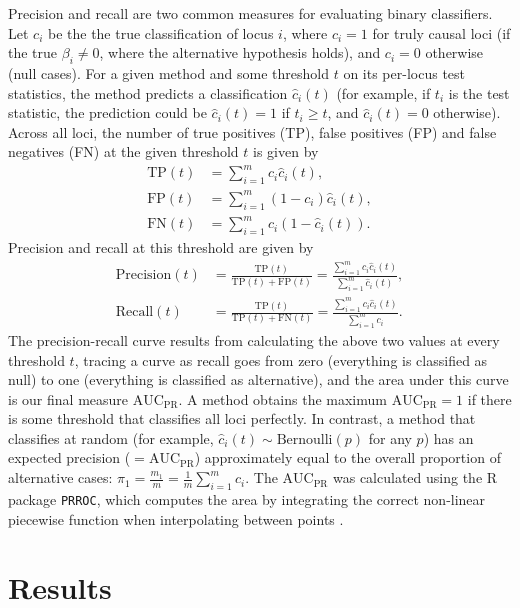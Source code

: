 \documentclass[11pt]{article}
\newcommand{\auc}{\text{AUC}_\text{PR}}
\begin{document}
Precision and recall are two common measures for evaluating binary classifiers.
Let $c_i$ be the the true classification of locus $i$, where $c_i = 1$ for truly causal loci (if the true $\beta_i \ne 0$, where the alternative hypothesis holds), and $c_i = 0$ otherwise (null cases).
For a given method and some threshold $t$ on its per-locus test statistics, the method predicts a classification $\hat{c}_i(t)$ (for example, if $t_i$ is the test statistic, the prediction could be $\hat{c}_i(t) = 1$ if $t_i \ge t$, and $\hat{c}_i(t) = 0$ otherwise).
Across all loci, the number of true positives (TP), false positives (FP) and false negatives (FN) at the given threshold $t$ is given by
\begin{align*}
  \text{TP}(t)
  &=
    \sum_{i = 1}^m c_i \hat{c}_i(t)
    , \\
  \text{FP}(t)
  &=
    \sum_{i = 1}^m (1 - c_i) \hat{c}_i(t)
    , \\
  \text{FN}(t)
  &=
    \sum_{i = 1}^m c_i \left( 1 - \hat{c}_i(t) \right)
    .
\end{align*}
Precision and recall at this threshold are given by
\begin{align*}
  \text{Precision}(t)
  &=
    \frac{ \text{TP}(t) }{ \text{TP}(t) + \text{FP}(t) }
    =
    \frac{ \sum_{i = 1}^m c_i \hat{c}_i(t) }{ \sum_{i = 1}^m \hat{c}_i(t) }
    , \\
  \text{Recall}(t)
  &=
    \frac{ \text{TP}(t) }{ \text{TP}(t) + \text{FN}(t) }
    =
    \frac{ \sum_{i = 1}^m c_i \hat{c}_i(t) }{ \sum_{i = 1}^m c_i }
    .
\end{align*}
The precision-recall curve results from calculating the above two values at every threshold $t$, tracing a curve as recall goes from zero (everything is classified as null) to one (everything is classified as alternative), and the area under this curve is our final measure $\auc$.
A method obtains the maximum $\auc = 1$ if there is some threshold that classifies all loci perfectly.
In contrast, a method that classifies at random (for example, $\hat{c}_i(t) \sim \text{Bernoulli}(p)$ for any $p$) has an expected precision ($= \auc$) approximately equal to the overall proportion of alternative cases:
$\pi_1 = \frac{m_1}{m} = \frac{1}{m} \sum_{i = 1}^m c_i$.
The $\auc$ was calculated using the R package \texttt{PRROC}, which computes the area by integrating the correct non-linear piecewise function when interpolating between points \citep{grau_prroc:_2015}.



\section{Results}
\end{document}
